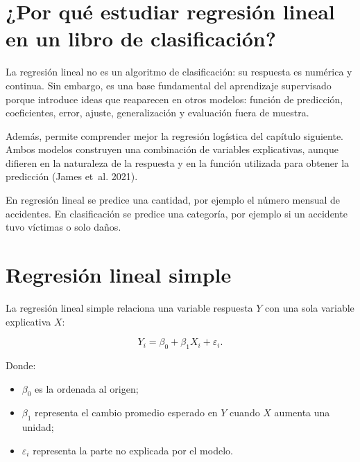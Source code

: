 \documentclass[
  spanish,
  10.5pt,
  letterpaper,
  openany,
  headings=big]{scrbook}
\providecommand{\tightlist}{%
  \setlength{\itemsep}{0pt}\setlength{\parskip}{0pt}}
\begin{document}
\section{¿Por qué estudiar regresión lineal en un libro de
clasificación?}\label{por-quuxe9-estudiar-regresiuxf3n-lineal-en-un-libro-de-clasificaciuxf3n}

La regresión lineal no es un algoritmo de clasificación: su respuesta es
numérica y continua. Sin embargo, es una base fundamental del
aprendizaje supervisado porque introduce ideas que reaparecen en otros
modelos: función de predicción, coeficientes, error, ajuste,
generalización y evaluación fuera de muestra.

Además, permite comprender mejor la regresión logística del capítulo
siguiente. Ambos modelos construyen una combinación de variables
explicativas, aunque difieren en la naturaleza de la respuesta y en la
función utilizada para obtener la predicción (James et~al. 2021).

\begin{tcolorbox}[enhanced jigsaw, arc=.35mm, bottomrule=.15mm, bottomtitle=1mm, breakable, colback=white, colbacktitle=quarto-callout-note-color!10!white, colframe=quarto-callout-note-color-frame, coltitle=black, left=2mm, leftrule=.75mm, opacityback=0, opacitybacktitle=0.6, rightrule=.15mm, title=\textcolor{quarto-callout-note-color}{\faInfo}\hspace{0.5em}{Idea central}, titlerule=0mm, toprule=.15mm, toptitle=1mm]

En regresión lineal se predice una cantidad, por ejemplo el número
mensual de accidentes. En clasificación se predice una categoría, por
ejemplo si un accidente tuvo víctimas o solo daños.

\end{tcolorbox}

\section{Regresión lineal simple}\label{regresiuxf3n-lineal-simple}

La regresión lineal simple relaciona una variable respuesta \(Y\) con
una sola variable explicativa \(X\):

\[
Y_i = \beta_0 + \beta_1 X_i + \varepsilon_i.
\]

Donde:

\begin{itemize}
\tightlist
\item
  \(\beta_0\) es la ordenada al origen;
\item
  \(\beta_1\) representa el cambio promedio esperado en \(Y\) cuando
  \(X\) aumenta una unidad;
\item
  \(\varepsilon_i\) representa la parte no explicada por el modelo.
\end{itemize}
\end{document}
